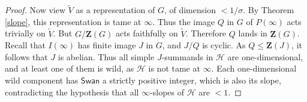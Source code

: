 \documentclass[11pt]{amsart}
\theoremstyle{plain}
\theoremstyle{definition}
\numberwithin{thm}{section}
\numberwithin{equation}{thm}
\newcommand{\Swan}{\mathsf {Swan}}
\newcommand{\sH}{{\mathcal H}}
\newcommand{\sL}{{\mathcal L}}
\newcommand{\0}{\emptyset}
\newcommand{\ZB}{{\mathbf Z}}
\newcommand{\geo}{{\mathrm {geom}}}
\newcommand{\triv}{{\mathds{1}}}
\begin{document}
\begin{proof}
Now view $\tilde V$ as a representation of $G$, of dimension $< 1/\sigma$. By Theorem \ref{slope}, this representation is tame at $\infty$. Thus the image $Q$ in $G$ of  $P(\infty)$ acts trivially on $\tilde V$. But $G/\ZB(G)$ acts faithfully on $\tilde V$. Therefore $Q$ lands in $\ZB(G)$. Recall that $I(\infty)$ has finite image $J$ in $G$, and $J/Q$ is cyclic. As $Q \leq \ZB(J)$, it follows that 
$J$ is abelian. Thus all simple $J$-summands in $\sH$ are one-dimensional, and at least one of them is wild, as $\sH$ is not tame at
$\infty$. Each one-dimensional wild component has $\Swan$ a strictly positive integer, which is also its slope, contradicting the hypothesis that
all $\infty$-slopes of $\sH$ are $<1$. 
\end{proof}
\end{document}
